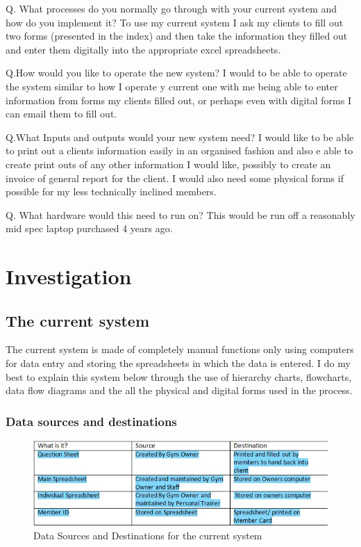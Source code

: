 Q. What processes do you normally go through with your current system and how do you implement it?
To use my current system I ask my clients to fill out two forms (presented in the index) and then take the information they filled out and enter them digitally into the appropriate excel spreadsheets.

Q.How would you like to operate the new system?
I would to be able to operate the system similar to how I operate y current one with me being able to enter information from forms my clients filled out, or perhaps even with digital forms I can email them to fill out.

Q.What Inputs and outputs would your new system need? 
I would like to be able to print out a clients information easily in an organised fashion and also e able to create print outs of any other information I would like, possibly to create an invoice of general report for the client. I would also need some physical forms if possible for my less technically inclined members.

Q. What hardware would this need to run on?
﻿This would be run off a reasonably mid spec laptop purchased 4 years ago.

\section{Investigation}


\subsection{The current system}

The current system is made of completely manual functions only using computers for data entry and storing the spreadsheets in which the data is entered. I do my best to explain this system below through the use of hierarchy charts, flowcharts, data flow diagrams and the all the physical and digital forms used in the process.

\subsubsection{Data sources and destinations}

\begin{figure}[H]
    \includegraphics[width=\textwidth]{InvestigationTable1.jpg}
    \caption{Data Sources and Destinations for the current system} \label{fig:Current Destinations}
\end{figure}

